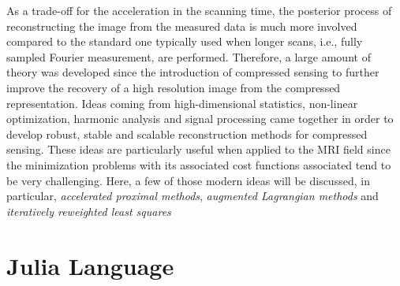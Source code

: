 
As a trade-off for the acceleration in the scanning time, the posterior process of reconstructing the image from the measured data is much more involved compared to the standard one typically used when longer scans, i.e., fully sampled Fourier measurement, are performed. Therefore, a large amount of theory was developed since the introduction of compressed sensing to further improve the recovery of a high resolution image from the compressed representation. Ideas coming from high-dimensional statistics, non-linear optimization, harmonic analysis and signal processing came together in order to develop robust, stable and scalable reconstruction methods for compressed sensing. These ideas are particularly useful when applied to the MRI field since the minimization problems with its associated cost functions associated tend to be very challenging. Here, a few of those modern ideas will be discussed, in particular, \emph{accelerated proximal methods}, \emph{augmented Lagrangian methods} and \emph{iteratively reweighted least squares}


\section{Julia Language}

